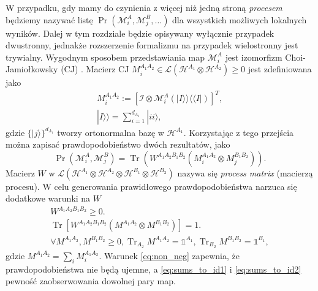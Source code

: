 \documentclass[10pt]{article} %
\DeclareMathOperator{\Trs}{Tr}
\newcommand{\Mats}[1]{\mathcal{L}(#1)}
\newcommand{\Hx}[1]{\mathcal{H}^{#1}}
\newcommand{\HAi}{\Hx{A_1}}
\newcommand{\MXi}[3]{\mathcal{M}^{#1}_{#2}(#3)}
\newcommand{\MXin}[2]{\mathcal{M}^{#1}_{#2}}
\newcommand{\MAin}[0]{\MXin{A}{i}}
\newcommand{\MAi}[1]{\MXi{A}{i}{#1}}
\newcommand{\Tr}[1]{\Trs(#1)}
\newcommand{\Prt}[2]{\Pr(#1, #2)}
\newcommand{\Ket}[1]{|#1\rangle}
\newcommand{\BBra}[1]{\langle\langle#1|}
\newcommand{\KKet}[1]{|#1\rangle\rangle}
\newcommand{\WAll}{W^{A_1A_2B_1B_2}}
\newcommand{\MA}{M^{A_1A_2}}
\newcommand{\MB}{M^{B_1B_2}}
\newcommand{\mai}[1]{\MA_{#1}}
\begin{document}
W przypadku, gdy mamy do czynienia z więcej niż jedną stroną \textit{procesem} będziemy nazywać listę $\Pr(\MXin{A}{i}, \MXin{B}{j}, \dots)$ dla wszystkich możliwych lokalnych wyników. Dalej w tym rozdziale będzie opisywany wyłącznie przypadek dwustronny, jednakże rozszerzenie formalizmu na przypadek wielostronny jest trywialny. Wygodnym sposobem przedstawiania map $\MAin$ jest izomorfizm Choi-Jamiołkowsky (CJ) \cite{cj_iso1, cj_iso2}. Macierz CJ $M^{A_1A_2}_i \in \Mats{\Hx{A_1} \otimes \Hx{A_2}} \geq 0$ jest zdefiniowana jako
\begin{gather}
\label{eq:cj_iso}
M^{A_1A_2}_i := [\mathcal{I} \otimes \MAi{ \KKet{I} \BBra{I}}]^T, \\
\KKet{I} = \sum^{d_{A_1}}_{i=1} \Ket{ii},
\end{gather}
gdzie $\{\Ket{j}\}^{d_{A_1}}$ tworzy ortonormalna bazę w $\HAi$. Korzystając z tego przejścia można zapisać prawdopodobieństwo dwóch rezultatów, jako 
\begin{equation}
\label{eq:cj_prob}
\Prt{\MAin}{\MXin{B}{j}} = \Tr{\WAll(M^{A_1A_2}_i \otimes M^{B_1B_2}_j)}.
\end{equation}
Macierz $W$ w $\Mats{\Hx{A_1} \otimes \Hx{A_2} \otimes \Hx{B_1} \otimes \Hx{B_2}}$ nazywa się \textit{process matrix} (macierzą procesu).
W celu generowania prawidłowego prawdopodobieństwa narzuca się dodatkowe warunki na $W$
\begin{gather}
\label{eq:non_neg}
\WAll \geq 0. \\
\label{eq:sums_to_id1}
\Trs
\left[
\WAll
\left(
M^{A_1A_2} \otimes M^{B_1B_2}
\right)
\right]=1.\\
\label{eq:sums_to_id2}
\forall M^{A_1A_2}, M^{B_1B_2} \geq 0, \Trs_{A_2} \MA = \mathbb{1}^{A_1}, \Trs_{B_2} \MB = \mathbb{1}^{B_1},
\end{gather}
gdzie $\MA = \sum_i \mai{i}$. Warunek \eqref{eq:non_neg} zapewnia, że prawdopodobieństwa nie będą ujemne, a \eqref{eq:sums_to_id1} i  \eqref{eq:sums_to_id2} pewność zaobserwowania dowolnej pary map. 
\end{document}
